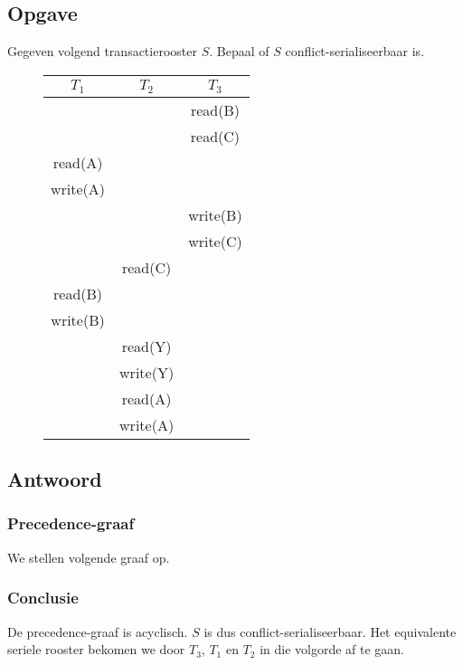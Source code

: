 \documentclass[transacties.tex]{subfiles}
\begin{document}
\subsection*{Opgave}
Gegeven volgend transactierooster $S$. Bepaal of $S$ conflict-serialiseerbaar is.
\begin{figure}[H]
\centering
\begin{tabular}{c|c|c}
$T_1$ & $T_2$ & $T_3$\\
\hline
&&read(B)\\
&&read(C)\\
read(A)&&\\
write(A)&&\\
&&write(B)\\
&&write(C)\\
&read(C)&\\
read(B)&&\\
write(B)&&\\
&read(Y)&\\
&write(Y)&\\
&read(A)&\\
&write(A)&\\
\end{tabular}
\end{figure}
\subsection*{Antwoord}
\subsubsection*{Precedence-graaf}
We stellen volgende graaf op.
\begin{figure}[H]
\centering
{}
\end{figure}
\subsubsection*{Conclusie}
De precedence-graaf is acyclisch. $S$ is dus conflict-serialiseerbaar. Het equivalente seriele rooster bekomen we door $T_3$, $T_1$ en $T_2$ in die volgorde af te gaan.
\end{document}
